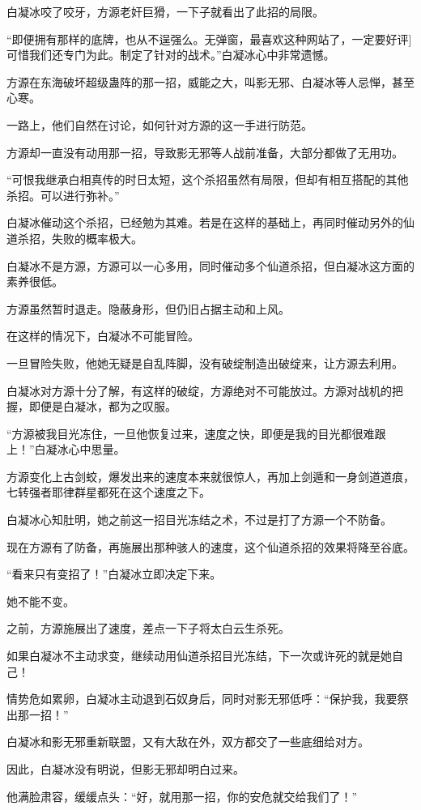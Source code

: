 \begin{this_body}
白凝冰咬了咬牙，方源老奸巨猾，一下子就看出了此招的局限。

“即便拥有那样的底牌，也从不逞强么。无弹窗，最喜欢这种网站了，一定要好评]可惜我们还专门为此。制定了针对的战术。”白凝冰心中非常遗憾。

方源在东海破坏超级蛊阵的那一招，威能之大，叫影无邪、白凝冰等人忌惮，甚至心寒。

一路上，他们自然在讨论，如何针对方源的这一手进行防范。

方源却一直没有动用那一招，导致影无邪等人战前准备，大部分都做了无用功。

“可恨我继承白相真传的时日太短，这个杀招虽然有局限，但却有相互搭配的其他杀招。可以进行弥补。”

白凝冰催动这个杀招，已经勉为其难。若是在这样的基础上，再同时催动另外的仙道杀招，失败的概率极大。

白凝冰不是方源，方源可以一心多用，同时催动多个仙道杀招，但白凝冰这方面的素养很低。

方源虽然暂时退走。隐蔽身形，但仍旧占据主动和上风。

在这样的情况下，白凝冰不可能冒险。

一旦冒险失败，他她无疑是自乱阵脚，没有破绽制造出破绽来，让方源去利用。

白凝冰对方源十分了解，有这样的破绽，方源绝对不可能放过。方源对战机的把握，即便是白凝冰，都为之叹服。

“方源被我目光冻住，一旦他恢复过来，速度之快，即便是我的目光都很难跟上！”白凝冰心中思量。

方源变化上古剑蛟，爆发出来的速度本来就很惊人，再加上剑遁和一身剑道道痕，七转强者耶律群星都死在这个速度之下。

白凝冰心知肚明，她之前这一招目光冻结之术，不过是打了方源一个不防备。

现在方源有了防备，再施展出那种骇人的速度，这个仙道杀招的效果将降至谷底。

“看来只有变招了！”白凝冰立即决定下来。

她不能不变。

之前，方源施展出了速度，差点一下子将太白云生杀死。

如果白凝冰不主动求变，继续动用仙道杀招目光冻结，下一次或许死的就是她自己！

情势危如累卵，白凝冰主动退到石奴身后，同时对影无邪低呼：“保护我，我要祭出那一招！”

白凝冰和影无邪重新联盟，又有大敌在外，双方都交了一些底细给对方。

因此，白凝冰没有明说，但影无邪却明白过来。

他满脸肃容，缓缓点头：“好，就用那一招，你的安危就交给我们了！”


\end{this_body}
